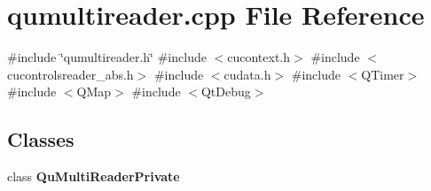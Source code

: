\section{qumultireader.\+cpp File Reference}
\label{qumultireader_8cpp}
{\ttfamily \#include \char`\"{}qumultireader.\+h\char`\"{}}\newline
{\ttfamily \#include $<$cucontext.\+h$>$}\newline
{\ttfamily \#include $<$cucontrolsreader\+\_\+abs.\+h$>$}\newline
{\ttfamily \#include $<$cudata.\+h$>$}\newline
{\ttfamily \#include $<$Q\+Timer$>$}\newline
{\ttfamily \#include $<$Q\+Map$>$}\newline
{\ttfamily \#include $<$Qt\+Debug$>$}\newline
\subsection*{Classes}
\begin{DoxyCompactItemize}
\item 
class \textbf{ Qu\+Multi\+Reader\+Private}
\end{DoxyCompactItemize}
